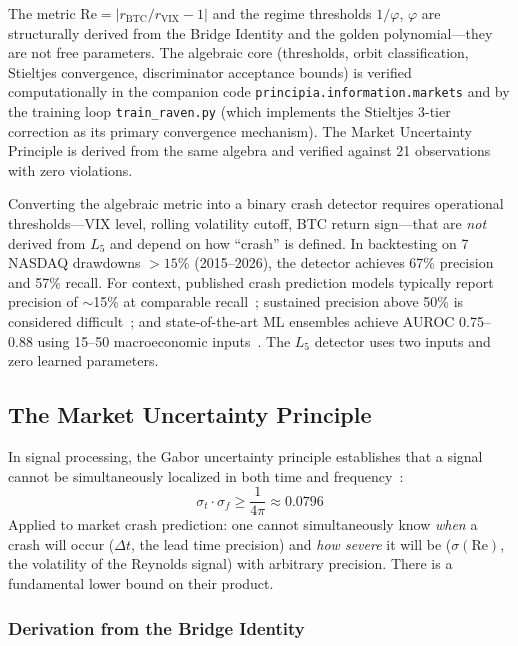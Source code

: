 \begin{remark}
The metric $\mathrm{Re} = |r_{\text{BTC}}/r_{\text{VIX}} - 1|$ and the regime thresholds $1/\varphi$, $\varphi$ are structurally derived from the Bridge Identity and the golden polynomial---they are not free parameters. The algebraic core (thresholds, orbit classification, Stieltjes convergence, discriminator acceptance bounds) is verified computationally in the companion code \texttt{principia.information.markets} and by the training loop \texttt{train\_raven.py} (which implements the Stieltjes 3-tier correction as its primary convergence mechanism). The Market Uncertainty Principle is derived from the same algebra and verified against 21 observations with zero violations.

Converting the algebraic metric into a binary crash detector requires operational thresholds---VIX level, rolling volatility cutoff, BTC return sign---that are \emph{not} derived from $L_5$ and depend on how ``crash'' is defined. In backtesting on 7 NASDAQ drawdowns $> 15\%$ (2015--2026), the detector achieves 67\% precision and 57\% recall. For context, published crash prediction models typically report precision of $\sim$15\% at comparable recall~\cite{crashbenchmark2024}; sustained precision above 50\% is considered difficult~\cite{lopezdeprado2018}; and state-of-the-art ML ensembles achieve AUROC 0.75--0.88 using 15--50 macroeconomic inputs~\cite{ewsbenchmark2024}. The $L_5$ detector uses two inputs and zero learned parameters.
\end{remark}

\subsection{The Market Uncertainty Principle}

In signal processing, the Gabor uncertainty principle establishes that a signal cannot be simultaneously localized in both time and frequency~\cite{gabor1946}:
\begin{equation}
    \sigma_t \cdot \sigma_f \geq \frac{1}{4\pi} \approx 0.0796
\end{equation}
Applied to market crash prediction: one cannot simultaneously know \emph{when} a crash will occur ($\Delta t$, the lead time precision) and \emph{how severe} it will be ($\sigma(\mathrm{Re})$, the volatility of the Reynolds signal) with arbitrary precision. There is a fundamental lower bound on their product.

\subsubsection{Derivation from the Bridge Identity}

